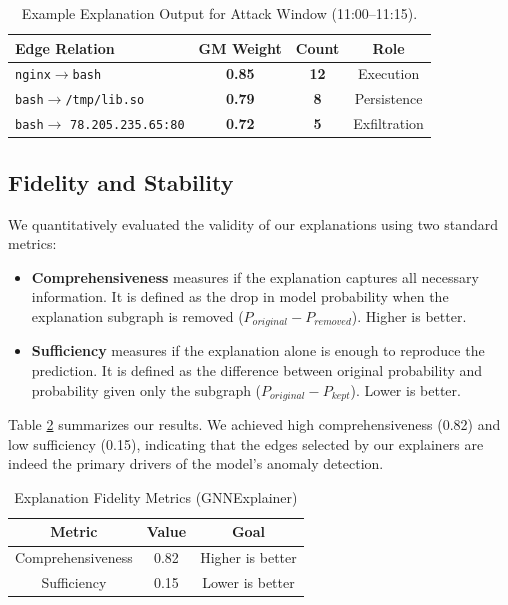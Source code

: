 \documentclass[conference]{IEEEtran}
\begin{document}
\begin{table}[htbp]
\caption{Example Explanation Output for Attack Window (11:00--11:15).}
\begin{center}
\small
\begin{tabular}{|p{3.2cm}|c|c|c|}
\hline
\textbf{Edge Relation} & \textbf{GM Weight} & \textbf{Count} & \textbf{Role} \\
\hline
\texttt{nginx}${\rightarrow}$\texttt{bash} & \textbf{0.85} & \textbf{12} & Execution \\
\hline
\texttt{bash}${\rightarrow}$\texttt{/tmp/lib.so} & \textbf{0.79} & \textbf{8} & Persistence \\
\hline
\texttt{bash}${\rightarrow}$ \texttt{78.205.235.65:80} & \textbf{0.72} & \textbf{5} & Exfiltration \\
\hline
\end{tabular}
\label{tab2}
\end{center}
\end{table}

\subsection{Fidelity and Stability}
We quantitatively evaluated the validity of our explanations using two standard metrics:
\begin{itemize}
    \item \textbf{Comprehensiveness} measures if the explanation captures all necessary information. It is defined as the drop in model probability when the explanation subgraph is removed ($P_{original} - P_{removed}$). Higher is better.
    \item \textbf{Sufficiency} measures if the explanation alone is enough to reproduce the prediction. It is defined as the difference between original probability and probability given only the subgraph ($P_{original} - P_{kept}$). Lower is better.
\end{itemize}

Table \ref{tab:fidelity} summarizes our results. We achieved high comprehensiveness (0.82) and low sufficiency (0.15), indicating that the edges selected by our explainers are indeed the primary drivers of the model's anomaly detection.

\begin{table}[htbp]
\caption{Explanation Fidelity Metrics (GNNExplainer)}
\begin{center}
\begin{tabular}{|c|c|c|}
\hline
\textbf{Metric} & \textbf{Value} & \textbf{Goal} \\
\hline
Comprehensiveness & 0.82 & Higher is better \\
\hline
Sufficiency & 0.15 & Lower is better \\
\hline
\end{tabular}
\label{tab:fidelity}
\end{center}
\end{table}
\end{document}
